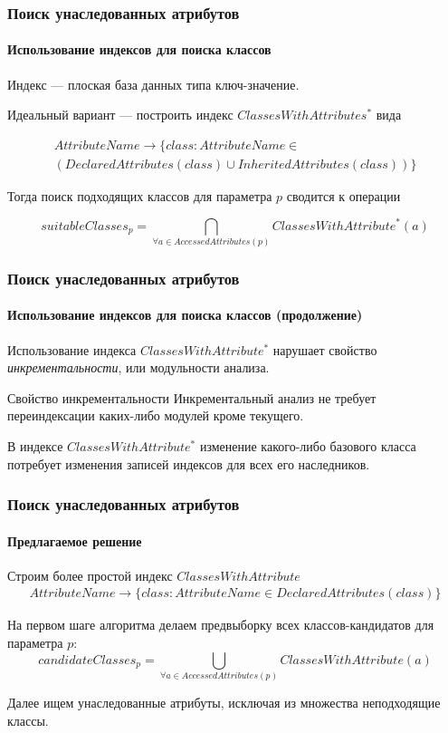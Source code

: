 \documentclass{beamer}
\begin{document}
\begin{frame}
  \frametitle{Поиск унаследованных атрибутов}
  \framesubtitle{Использование индексов для поиска классов}
  
  Индекс --- плоская база данных типа ключ-значение.

  Идеальный вариант --- построить индекс $ClassesWithAttributes^*$ вида

  \begin{multline*}
    AttributeName \rightarrow \{class: AttributeName \in \\
  (DeclaredAttributes(class) \cup InheritedAttributes(class)) \}
  \end{multline*}

  Тогда поиск подходящих классов для параметра $p$ сводится к операции

  \[
    suitableClasses_p = \bigcap\limits_{\forall{a} \in AccessedAttributes(p)}
    ClassesWithAttribute^*(a)
  \]
  
\end{frame}

\begin{frame}
  \frametitle{Поиск унаследованных атрибутов}
  \framesubtitle{Использование индексов для поиска классов (продолжение)}

  Использование индекса $ClassesWithAttribute^*$ нарушает свойство
  \emph{инкрементальности}, или модульности анализа.

  \begin{block}{Свойство инкрементальности}
    Инкрементальный анализ не требует переиндексации каких-либо модулей
    кроме текущего.
  \end{block}

  В индексе $ClassesWithAttribute^*$ изменение какого-либо базового класса
  потребует изменения записей индексов для всех его наследников.
\end{frame}

\begin{frame}
  \frametitle{Поиск унаследованных атрибутов}
  \framesubtitle{Предлагаемое решение}

  Строим более простой индекс $ClassesWithAttribute$
  \begin{multline*}
    AttributeName \rightarrow \{class: AttributeName \in DeclaredAttributes(class) \}
  \end{multline*}

  На первом шаге алгоритма делаем предвыборку всех классов-кандидатов для
  параметра $p$:  
  \[
    candidateClasses_p = \bigcup\limits_{\forall{a} \in AccessedAttributes(p)}
    ClassesWithAttribute(a)
  \]

  Далее ищем унаследованные атрибуты, исключая из множества неподходящие классы.
    
\end{frame}
\end{document}
